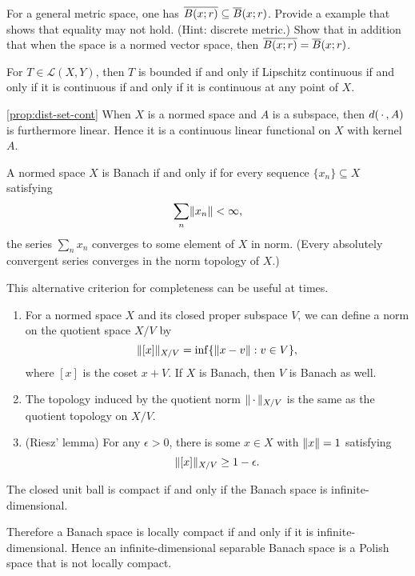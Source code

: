 \begin{xca} \label{xca:clos-ball-metric-Banach}
    For a general metric space, one has $\overline{B(x;r)} \subseteq \overline{B}(x;r)$. Provide a example that shows that equality may not hold. (Hint: discrete metric.) Show that in addition that when the space is a normed vector space, then $\overline{B(x;r)} = \overline{B}(x;r)$.
\end{xca}

\begin{prop}
    For $T \in \mathcal{L}(X,Y)$, then $T$ is bounded if and only if Lipschitz continuous if and only if it is continuous if and only if it is continuous at any point of $X$.
\end{prop}

\cref{prop:dist-set-cont}
When $X$ is a normed space and $A$ is a subspace, then $d(\,\cdot\,,A)$ is furthermore linear. Hence it is a continuous linear functional on $X$ with kernel $A$.

\begin{prop}
    A normed space $X$ is Banach if and only if for every sequence $\{x_n\} \subseteq X$ satisfying \[
        \sum_{n}\lVert x_n \rVert < \infty,
    \] the series $\sum_n x_n $ converges to some element of $X$ in norm. (Every absolutely convergent series converges in the norm topology of $X$.)
\end{prop}

This alternative criterion for completeness can be useful at times.

\begin{prop}\leavevmode
    \begin{enumerate}
        \item For a normed space $X$ and its closed proper subspace $V$, we can define a norm on the quotient space $X/V$ by \[
        \lVert [x] \rVert_{X / V} = \inf\{\lVert x - v \rVert : v \in V\},
        \] where $[x]$ is the coset $x + V$. If $X$ is Banach, then $V$ is Banach as well.
        \item The topology induced by the quotient norm $\lVert \,\cdot\, \rVert_{X/V}$ is the same as the quotient topology on $X / V$.
        \item (Riesz' lemma) For any $\epsilon >0$, there is some $x \in X$ with $\lVert x \rVert = 1$ satisfying \[
        \lVert [x] \rVert_{X / V} \geq 1 - \epsilon.
        \]
    \end{enumerate}
\end{prop}

\begin{prop}
    The closed unit ball is compact if and only if the Banach space is infinite-dimensional.

    Therefore a Banach space is locally compact if and only if it is infinite-dimensional. Hence an infinite-dimensional separable Banach space is a Polish space that is not locally compact.
\end{prop}


